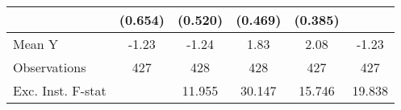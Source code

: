 {\begin{tabular}{l*{5}{c}}
            &     (0.654)         &     (0.520)         &     (0.469)         &     (0.385)         &                     \\
\midrule
Mean Y      &       -1.23         &       -1.24         &        1.83         &        2.08         &       -1.23         \\
Observations&         427         &         428         &         428         &         427         &         427         \\
Exc. Inst. F-stat&                     &      11.955         &      30.147         &      15.746         &      19.838         \\
\bottomrule
\end{tabular}
}
